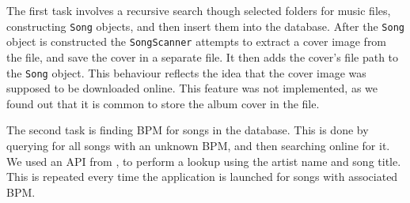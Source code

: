 The first task involves a recursive search though selected folders for music files, constructing \texttt{Song} objects, and then insert them into the database. After the \texttt{Song} object is constructed the \texttt{SongScanner} attempts to extract a cover image from the file, and save the cover in a separate file. It then adds the cover's file path to the \texttt{Song} object. This behaviour reflects the idea that the cover image was supposed to be downloaded online. This feature was not implemented, as we found out that it is common to store the album cover in the file.

The second task is finding BPM for songs in the database. This is done by querying for all songs with an unknown BPM, and then searching online for it. We used an API from \citet{echonest:API}, to perform a lookup using the artist name and song title. This is repeated every time the application is launched for songs with associated BPM.